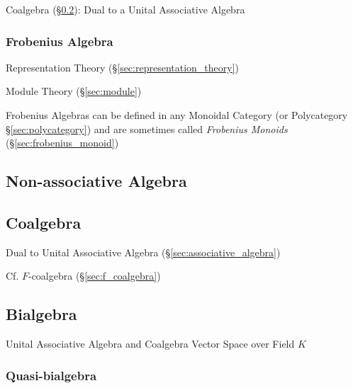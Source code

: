 Coalgebra (\S\ref{sec:coalgebra}): Dual to a Unital Associative
Algebra



\subsubsection{Frobenius Algebra}\label{sec:frobenius_algebra}

Representation Theory (\S\ref{sec:representation_theory})

Module Theory (\S\ref{sec:module})

Frobenius Algebras can be defined in any Monoidal Category (or
Polycategory \S\ref{sec:polycategory}) and are sometimes called
\emph{Frobenius Monoids} (\S\ref{sec:frobenius_monoid})



\subsection{Non-associative Algebra}
\label{sec:nonassociative_algebra}

\subsection{Coalgebra}\label{sec:coalgebra}

Dual to Unital Associative Algebra (\S\ref{sec:associative_algebra})

Cf. $F$-coalgebra (\S\ref{sec:f_coalgebra})



\subsection{Bialgebra}\label{sec:bialgebra}

Unital Associative Algebra and Coalgebra Vector Space over Field $K$



\subsubsection{Quasi-bialgebra}\label{sec:quasi_bialgebra}

